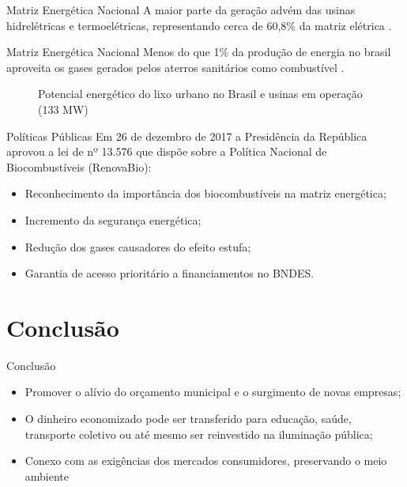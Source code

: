 \documentclass[aspectraio=169,8pt,slidestop,xcolor=table]{beamer}
\newcommand{\fonte}[1]{{\resizebox{!}{5pt}{Fonte: #1}}}
\begin{document}
\begin{frame}{Matriz Energética Nacional}
A maior parte da geração advém das usinas hidrelétricas e termoelétricas, representando cerca de 60,8\% da matriz elétrica \cite{big:aneel}.

\end{frame}

\begin{frame}{Matriz Energética Nacional}
Menos do que 1\% da produção de energia no brasil aproveita os gases gerados pelos aterros sanitários como combustível \cite{big:aneel}.

\begin{figure}[ht]
    \centering
    \caption{Potencial energético do lixo urbano no Brasil e usinas em operação (133 MW)}
    \fonte{O autor}
\end{figure}


\end{frame}


\begin{frame}{Políticas Públicas}
Em 26 de dezembro de 2017 a Presidência da República aprovou a lei de nº 13.576 que dispõe sobre a Política Nacional de Biocombustíveis (RenovaBio):

\begin{itemize}
	\item Reconhecimento da importância dos biocombustíveis na matriz energética;
	\item Incremento da segurança energética;
	\item Redução dos gases causadores do efeito estufa;
	\item Garantia de acesso prioritário a financiamentos no BNDES.
\end{itemize}

\end{frame}


\section{Conclusão}
\begin{frame}{Conclusão}
\begin{itemize}
	\item Promover o alívio do orçamento municipal e o surgimento de novas empresas;
	\item O dinheiro economizado pode ser transferido para educação, saúde, transporte coletivo ou até mesmo ser reinvestido na iluminação pública;
	\item Conexo com as exigências dos mercados consumidores, preservando o meio ambiente
\end{itemize}

\end{frame}
\end{document}
